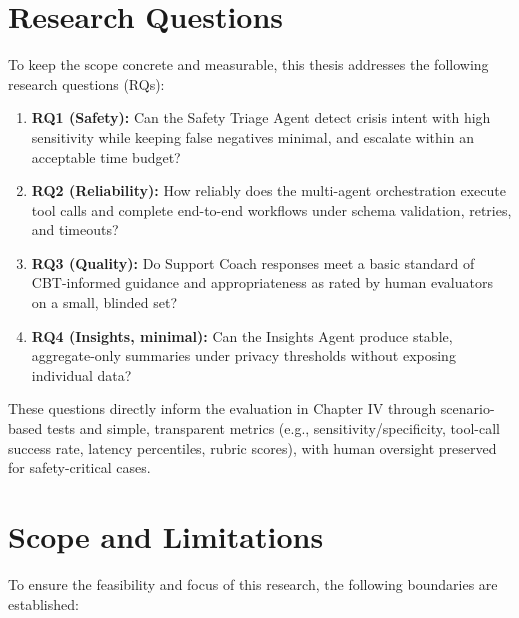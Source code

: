 
\section{Research Questions}
\label{sec:research_questions}

To keep the scope concrete and measurable, this thesis addresses the following research questions (RQs):

\begin{enumerate}
    \item \textbf{RQ1 (Safety):} Can the Safety Triage Agent detect crisis intent with high sensitivity while keeping false negatives minimal, and escalate within an acceptable time budget?
    \item \textbf{RQ2 (Reliability):} How reliably does the multi-agent orchestration execute tool calls and complete end-to-end workflows under schema validation, retries, and timeouts?
    \item \textbf{RQ3 (Quality):} Do Support Coach responses meet a basic standard of CBT-informed guidance and appropriateness as rated by human evaluators on a small, blinded set?
    \item \textbf{RQ4 (Insights, minimal):} Can the Insights Agent produce stable, aggregate-only summaries under privacy thresholds without exposing individual data?
\end{enumerate}

These questions directly inform the evaluation in Chapter IV through scenario-based tests and simple, transparent metrics (e.g., sensitivity/specificity, tool-call success rate, latency percentiles, rubric scores), with human oversight preserved for safety-critical cases.


\section{Scope and Limitations}
\label{sec:scope_and_limitations}

To ensure the feasibility and focus of this research, the following boundaries are established:

